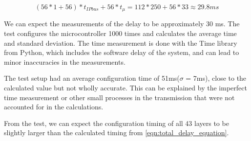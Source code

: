 \documentclass[main.tex]{subfiles}
\begin{document}
\begin{equation} \label{eqn:one_layer_delay}
(56*1+56)*t_{IPbus}+56*t_{\mu }= 112 * 250 + 56*33 \approx 29.8 ms
\end{equation}

We can expect the measurements of the delay to be approximately 30 ms. The test configures the microcontroller 1000 times and calculates the average time and standard deviation. The time measurement is done with the Time library from Python, which includes the software delay of the system, and can lead to minor inaccuracies in the measurements.

The test setup had an average configuration time of 51ms($\sigma$ = 7ms), close to the calculated value but not wholly accurate. This can be explained by the imperfect time measurement or other small processes in the transmission that were not accounted for in the calculations.

From the test, we can expect the configuration timing of all 43 layers to be slightly larger than the calculated timing from \autoref{eqn:total_delay_equation}.
\end{document}
